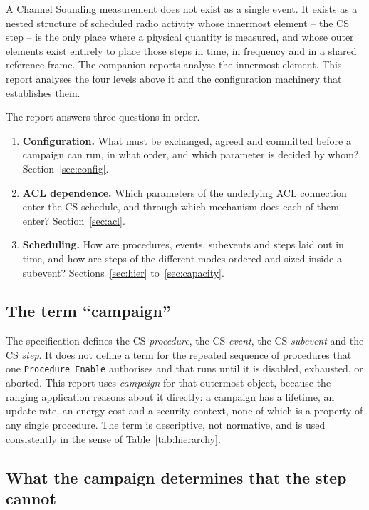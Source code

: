 \documentclass[11pt,a4paper]{article}
\newcommand{\code}[1]{\texttt{\small #1}}
\begin{document}
A Channel Sounding measurement does not exist as a single event. It exists as a nested structure of
scheduled radio activity whose innermost element -- the CS step -- is the only place where a physical
quantity is measured, and whose outer elements exist entirely to place those steps in time, in
frequency and in a shared reference frame. The companion reports analyse the innermost element. This
report analyses the four levels above it and the configuration machinery that establishes them.

The report answers three questions in order.

\begin{enumerate}[leftmargin=1.5em,itemsep=3pt]
\item \textbf{Configuration.} What must be exchanged, agreed and committed before a campaign can run,
      in what order, and which parameter is decided by whom? Section~\ref{sec:config}.
\item \textbf{ACL dependence.} Which parameters of the underlying ACL connection enter the CS
      schedule, and through which mechanism does each of them enter?
      Section~\ref{sec:acl}.
\item \textbf{Scheduling.} How are procedures, events, subevents and steps laid out in time, and how
      are steps of the different modes ordered and sized inside a subevent?
      Sections~\ref{sec:hier} to~\ref{sec:capacity}.
\end{enumerate}

\subsection{The term ``campaign''}

The specification defines the CS \emph{procedure}, the CS \emph{event}, the CS \emph{subevent} and
the CS \emph{step}. It does not define a term for the repeated sequence of procedures that one
\code{Procedure\_Enable} authorises and that runs until it is disabled, exhausted, or aborted. This
report uses \emph{campaign} for that outermost object, because the ranging application reasons about
it directly: a campaign has a lifetime, an update rate, an energy cost and a security context, none
of which is a property of any single procedure. The term is descriptive, not normative, and is used
consistently in the sense of Table~\ref{tab:hierarchy}.

\subsection{What the campaign determines that the step cannot}
\end{document}

